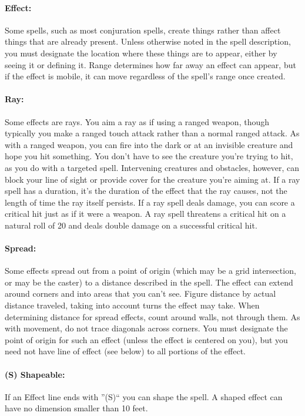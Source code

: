 \paragraph{Effect:} Some spells, such as most conjuration spells, create things rather than affect things that are already present. 
Unless otherwise noted in the spell description, you must designate the location where these things are to appear, either by seeing it or defining it. Range determines how far away an effect can appear, but if the effect is mobile, it can move regardless of the spell's range once created.

\paragraph{Ray:} Some effects are rays. You aim a ray as if using a ranged weapon, though typically you make a ranged touch attack rather than a normal ranged attack. 
As with a ranged weapon, you can fire into the dark or at an invisible creature and hope you hit something. 
You don't have to see the creature you're trying to hit, as you do with a targeted spell. 
Intervening creatures and obstacles, however, can block your line of sight or provide cover for the creature you're aiming at.
If a ray spell has a duration, it's the duration of the effect that the ray causes, not the length of time the ray itself persists.
If a ray spell deals damage, you can score a critical hit just as if it were a weapon. 
A ray spell threatens a critical hit on a natural roll of 20 and deals double damage on a successful critical hit.

\paragraph{Spread:} Some effects spread out from a point of origin (which may be a grid intersection, or may be the caster) to a distance described in the spell. The effect can extend around corners and into areas that you can't see. 
Figure distance by actual distance traveled, taking into account turns the effect may take. 
When determining distance for spread effects, count around walls, not through them. 
As with movement, do not trace diagonals across corners. 
You must designate the point of origin for such an effect (unless the effect is centered on you), but you need not have line of effect (see below) to all portions of the effect.

\paragraph{(S) Shapeable:} If an Effect line ends with ''(S)`` you can shape the spell. 
A shaped effect can have no dimension smaller than 10 feet.

